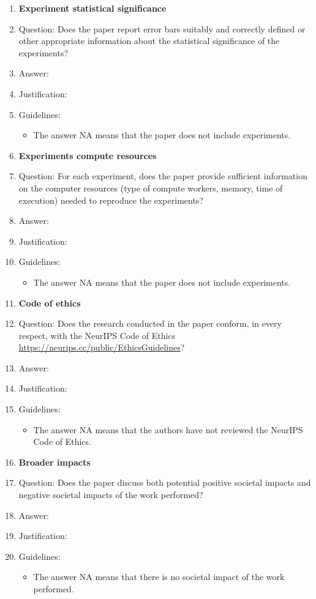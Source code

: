 \documentclass{article}
\begin{document}
\begin{enumerate}
\item {\bf Experiment statistical significance}
    \item[] Question: Does the paper report error bars suitably and correctly defined or other appropriate information about the statistical significance of the experiments?
    \item[] Answer: \answerTODO{}
    \item[] Justification: \justificationTODO{}
    \item[] Guidelines:
    \begin{itemize}
        \item The answer NA means that the paper does not include experiments.
    \end{itemize}

\item {\bf Experiments compute resources}
    \item[] Question: For each experiment, does the paper provide sufficient information on the computer resources (type of compute workers, memory, time of execution) needed to reproduce the experiments?
    \item[] Answer: \answerTODO{}
    \item[] Justification: \justificationTODO{}
    \item[] Guidelines:
    \begin{itemize}
        \item The answer NA means that the paper does not include experiments.
    \end{itemize}

\item {\bf Code of ethics}
    \item[] Question: Does the research conducted in the paper conform, in every respect, with the NeurIPS Code of Ethics \url{https://neurips.cc/public/EthicsGuidelines}?
    \item[] Answer: \answerTODO{}
    \item[] Justification: \justificationTODO{}
    \item[] Guidelines:
    \begin{itemize}
        \item The answer NA means that the authors have not reviewed the NeurIPS Code of Ethics.
    \end{itemize}

\item {\bf Broader impacts}
    \item[] Question: Does the paper discuss both potential positive societal impacts and negative societal impacts of the work performed?
    \item[] Answer: \answerTODO{}
    \item[] Justification: \justificationTODO{}
    \item[] Guidelines:
    \begin{itemize}
        \item The answer NA means that there is no societal impact of the work performed.
    \end{itemize}


\end{enumerate}
\end{document}
